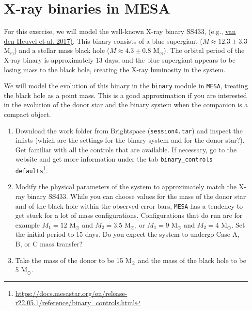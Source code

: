 \documentclass[11pt,a4paper]{article}
\begin{document}
\section{X-ray binaries in MESA}

For this exercise, we will model the well-known X-ray binary SS433, (e.g., \href{https://ui.adsabs.harvard.edu/abs/2017MNRAS.471.4256V/abstract}{van den Heuvel et al. 2017)}. This binary consists of a blue supergiant ($M \approx 12.3 \pm 3.3$ M$_\odot$) and a stellar mass black hole ($M \approx 4.3 \pm 0.8$ M$_\odot$). The orbital period of the X-ray binary is approximately 13 days, and the blue supergiant appears to be losing mass to the black hole, creating the X-ray luminosity in the system.

We will model the evolution of this binary in the \texttt{binary} module in \texttt{MESA}, treating the black hole as a point mass. This is a good approximation if you are interested in the evolution of the donor star and the binary system when the companion is a compact object. 

\begin{enumerate}
  \item Download the work folder from Brightspace (\verb|session4.tar|) and inspect the inlists (which are the settings for the binary system and for the donor star?). Get familiar with all the controls that are available. If necessary, go to the website and get more information under the tab \verb|binary_controls defaults|\footnote{\url{https://docs.mesastar.org/en/release-r22.05.1/reference/binary_controls.html}}. 
  
  \item Modify the physical parameters of the system to approximately match the X-ray binary SS433. While you can choose values for the mass of the donor star and of the black hole within the observed error bars, \texttt{MESA} has a tendency to get stuck for a lot of mass configurations. Configurations that do run are for example $M_1=12$  M$_\odot$ and $M_2=3.5$  M$_\odot$, or $M_1=9$  M$_\odot$ and $M_2=4$  M$_\odot$. Set the initial period to 15 days. Do you expect the system to undergo Case A, B, or C mass transfer?
  
  
  \item  Take the mass of the donor to be 15 M$_\odot$ and the mass of the black hole to be 5 M$_\odot$. 

  \end{enumerate}
\end{document}
